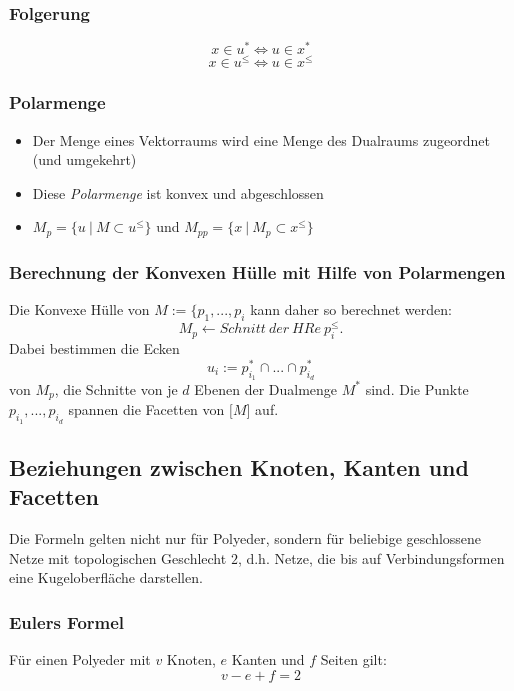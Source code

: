 \subsubsection{Folgerung}
\[x \in u^* \Leftrightarrow u \in x^*\]
\[x \in u^{\leq} \Leftrightarrow u \in x^{\leq}\]

\subsubsection{Polarmenge}
\begin{itemize}
	\item Der Menge eines Vektorraums wird eine Menge des Dualraums zugeordnet (und umgekehrt)
	\item Diese \textit{Polarmenge} ist konvex und abgeschlossen
	\item \(M_p = \{u~|~M \subset u^{\leq}\}\) und \(M_{pp} = \{x~|~M_p \subset x^{\leq}\}\)
\end{itemize}

\subsubsection{Berechnung der Konvexen Hülle mit Hilfe von Polarmengen}
Die Konvexe Hülle von \(M := \{p_1,...,p_i\) kann daher so berechnet werden:
\[M_p \longleftarrow Schnitt~der~HRe~p_i^{\leq}.\]
Dabei bestimmen die Ecken
\[u_i := p_{i_1}^* \cap ... \cap p_{i_d}^*\]
von \(M_p\), die Schnitte von je \(d\) Ebenen der Dualmenge \(M^*\) sind. Die Punkte \(p_{i_1},...,p_{i_d}\) spannen die Facetten von \(\lbrack M \rbrack\) auf.


\subsection{Beziehungen zwischen Knoten, Kanten und Facetten}
Die Formeln gelten nicht nur für Polyeder, sondern für beliebige geschlossene Netze mit topologischen Geschlecht \(2\), d.h. Netze, die bis auf Verbindungsformen eine Kugeloberfläche darstellen.

\subsubsection{Eulers Formel}
Für einen Polyeder mit \(v\) Knoten, \(e\) Kanten und \(f\) Seiten gilt:
\[v-e+f=2\]


